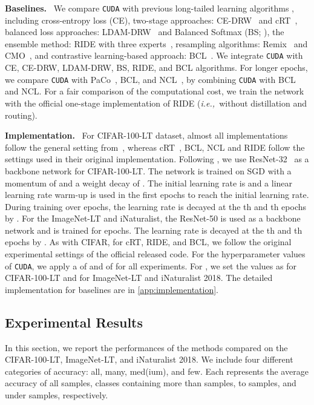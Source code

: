 \documentclass{article}
\newcommand{\ie}{\emph{i.e.,~}}
\newcommand{\myparagraph}[1]{\vspace{0.07cm}\noindent\textbf{#1}~}
\def\code#1{\texttt{#1}}
\newcommand{\alg}{\code{CUDA}\xspace}
\renewcommand*\cite[1]{\citep{#1}}
\begin{document}
\myparagraph{Baselines.} We compare \alg with previous long-tailed learning algorithms , including cross-entropy loss (CE), two-stage approaches: CE-DRW~\cite{cao2019learning} and cRT~\cite{kang2019decoupling}, balanced loss approaches: LDAM-DRW~\cite{cao2019learning} and Balanced Softmax (BS; \citealt{ren2020balanced}), the ensemble method: RIDE with three experts~\cite{wang2021longtailed}, resampling algorithms: Remix~\cite{chou2020remix} and CMO~\cite{park2022majority}, and contrastive learning-based approach: BCL~\cite{zhu2022balanced}. We integrate \alg with CE, CE-DRW, LDAM-DRW, BS, RIDE, and BCL algorithms. For longer epochs, we compare \alg with PaCo~\cite{cui2021parametric}, BCL, and NCL~\cite{li2022nested}, by combining \alg with BCL and NCL. For a fair comparison of the computational cost, we train the network with the official one-stage implementation of RIDE (\ie without distillation and routing).

\myparagraph{Implementation.} For CIFAR-100-LT dataset, almost all implementations follow the general setting from~\citet{cao2019learning}, whereas cRT~\cite{kang2019decoupling}, BCL, NCL and RIDE follow the settings used in their original implementation. Following \citet{cao2019learning}, we use ResNet-32~\cite{he2016deep} as a backbone network for CIFAR-100-LT. The network is trained on SGD with a momentum of  and a weight decay of . The initial learning rate is  and a linear learning rate warm-up is used in the first  epochs to reach the initial learning rate. During training over  epochs, the learning rate is decayed at the th and th epochs by . 
For the ImageNet-LT and iNaturalist, the ResNet-50 is used as a backbone network and is trained for  epochs. The learning rate is decayed at the th and th epochs by . As with CIFAR, for cRT, RIDE, and BCL, we follow the original experimental settings of the official released code. For the hyperparameter values of \alg, we apply a  of  and  of  for all experiments. For , we set the values as  for CIFAR-100-LT and  for ImageNet-LT and iNaturalist 2018. The detailed implementation for baselines are in \autoref{app:implementation}.

\subsection{Experimental Results}
\label{exp:result}
In this section, we report the performances of the methods compared on the CIFAR-100-LT, ImageNet-LT, and iNaturalist 2018. We include four different categories of accuracy: all, many, med(ium), and few. Each represents the average accuracy of all samples, classes containing more than  samples,  to  samples, and under  samples, respectively.
\end{document}

